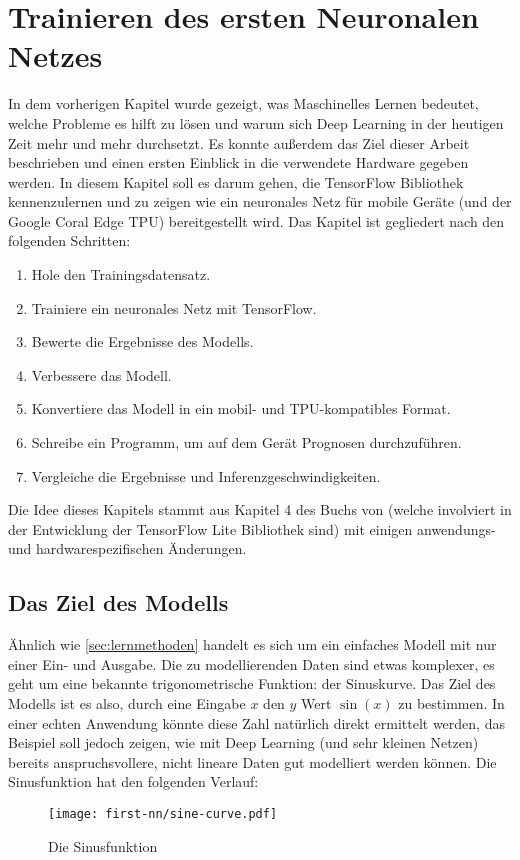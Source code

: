 \chapter{Trainieren des ersten Neuronalen Netzes}
In dem vorherigen Kapitel wurde gezeigt,
was Maschinelles Lernen bedeutet, welche
Probleme es hilft zu lösen und warum sich
Deep Learning in der heutigen Zeit mehr und mehr durchsetzt.
Es konnte außerdem das Ziel dieser Arbeit
beschrieben und einen ersten Einblick
in die verwendete Hardware gegeben werden.
In diesem Kapitel soll es darum gehen, die
TensorFlow Bibliothek kennenzulernen
und zu zeigen wie ein neuronales Netz
für mobile Geräte (und der Google Coral Edge TPU) bereitgestellt wird.
Das Kapitel ist gegliedert nach den folgenden Schritten:
\begin{enumerate}
  \item Hole den Trainingsdatensatz.
  \item Trainiere ein neuronales Netz mit TensorFlow.
  \item Bewerte die Ergebnisse des Modells.
  \item Verbessere das Modell.
  \item Konvertiere das Modell in ein mobil- und TPU-kompatibles Format.
  \item Schreibe ein Programm, um auf dem Gerät Prognosen durchzuführen.
  \item Vergleiche die Ergebnisse und Inferenzgeschwindigkeiten.
\end{enumerate}
Die Idee dieses Kapitels stammt aus Kapitel 4 des Buchs 
von \textcite{book:tiny-ml} (welche involviert in der Entwicklung
der TensorFlow Lite Bibliothek sind) mit einigen
anwendungs- und hardwarespezifischen Änderungen.

\section{Das Ziel des Modells}
Ähnlich wie \autoref{sec:lernmethoden} handelt es sich
um ein einfaches Modell mit nur einer Ein- und Ausgabe.
Die zu modellierenden Daten sind etwas komplexer,
es geht um eine bekannte trigonometrische Funktion: der Sinuskurve.
Das Ziel des Modells ist es also, durch eine Eingabe $x$
den $y$ Wert $\sin(x)$ zu bestimmen.
In einer echten Anwendung könnte
diese Zahl natürlich direkt ermittelt werden,
das Beispiel soll jedoch zeigen,
wie mit Deep Learning (und sehr kleinen Netzen)
bereits anspruchsvollere, nicht lineare Daten gut modelliert werden können.
Die Sinusfunktion hat den folgenden Verlauf:
\begin{figure}[h!]
  \centering
  \texttt{[image: first-nn/sine-curve.pdf]}
  \caption{Die Sinusfunktion}
  \label{plot:sine-curve}
\end{figure}

